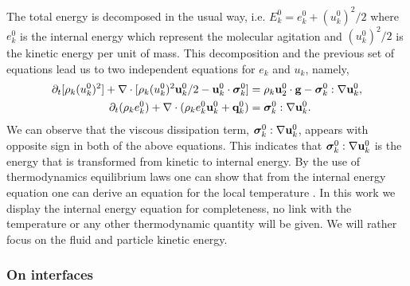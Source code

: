 The total energy is decomposed in the usual way, i.e. $E_k^0 = e_k^0 + (u_k^0)^2/2$ where  $e_k^0$ is the internal energy which represent the molecular agitation and $(u_k^0)^2/2$ is the kinetic energy per unit of mass.
This decomposition and the previous set of equations lead us to two independent equations for $e_k$ and $u_k$, namely,
\begin{align}
    \label{eq:dt_rhou_k2}
    \partial_t [\rho_k(u_k^0)^2]  
    + \mathbf{\nabla}\cdot [\rho_k(u_k^0)^2\textbf{u}_k^0/2 - \textbf{u}_k^0 \cdot \bm{\sigma}_k^0]
    &=
    \rho_k\textbf{u}_2^0 \cdot \textbf{g}  
    -  \bm{\sigma}_k^0 : \mathbf{\nabla} \textbf{u}_k^0,
    \\
    \label{eq:dt_rhoe_k}
    \partial_t (\rho_ke_k^0)  
    + \mathbf{\nabla}\cdot (
        \rho_ke_k^0\textbf{u}_k^0
        + \textbf{q}_k^0
        )
    &= 
    \bm{\sigma}_k^0 : \mathbf{\nabla} \textbf{u}_k^0. 
\end{align} 
We can observe that the viscous dissipation term, $\bm{\sigma}_k^0 : \mathbf{\nabla} \textbf{u}_k^0$,  appears with opposite sign in both of the above equations.
This indicates that $\bm{\sigma}_k^0 : \mathbf{\nabla} \textbf{u}_k^0$ is the energy that is transformed from kinetic to internal energy. 
By the use of thermodynamics equilibrium laws one can show that from the internal energy equation one can derive an equation for the local temperature \citet{ishii2010thermo}.
In this work we display the internal energy equation for completeness, no link with the temperature or any other thermodynamic quantity will be given. 
We will rather focus on the fluid and particle kinetic energy. 

\subsubsection{On interfaces}


